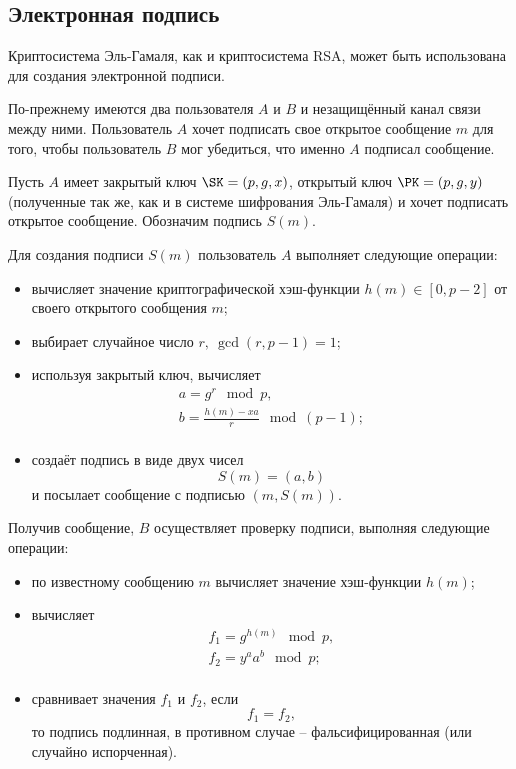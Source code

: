 \exampleend
{}

\subsection{Электронная подпись}

Криптосистема Эль-Гамаля, как и криптосистема RSA, может быть использована для создания электронной подписи.

По-прежнему имеются два пользователя $A$ и $B$ и незащищённый канал связи между ними. Пользователь $A$  хочет подписать свое открытое сообщение $m$  для того, чтобы пользователь $B$ мог убедиться, что именно $A$ подписал сообщение.

Пусть $A$ имеет закрытый ключ $\SK = (p, g, x)$, открытый ключ $\PK = (p, g, y)$ (полученные так же, как и в системе шифрования Эль-Гамаля) и хочет подписать открытое сообщение. Обозначим подпись $S(m)$.

Для создания подписи $S(m)$ пользователь $A$ выполняет следующие операции:
\begin{itemize}
    \item вычисляет значение криптографической хэш-функции  $h(m) \in [0,p-2]$ от своего открытого сообщения $m$;
    \item выбирает случайное число $r, ~ \gcd(r, p-1)=1$;
    \item используя закрытый ключ, вычисляет
        \[ \begin{array}{l}
            a = g^r \mod p, \\
            b = \frac{h(m) - xa}{r} \mod (p-1); \\
        \end{array} \]
    \item создаёт подпись в виде двух чисел
        \[ S(m) = (a, b) \]
        и посылает сообщение с подписью $(m, S(m))$.
\end{itemize}

Получив сообщение, $B$ осуществляет проверку подписи, выполняя следующие операции:
\begin{itemize}
    \item по известному сообщению $m$ вычисляет значение хэш-функции $h(m)$;
    \item вычисляет
        \[ \begin{array}{l}
            f_1 = g^{h(m)} \mod p, \\
            f_2 = y^a a^b \mod p; \\
        \end{array} \]
    \item сравнивает значения $f_1$ и $f_2$, если
        \[ f_1 = f_2, \]
        то подпись подлинная, в противном случае -- фальсифицированная (или случайно испорченная).
\end{itemize}

